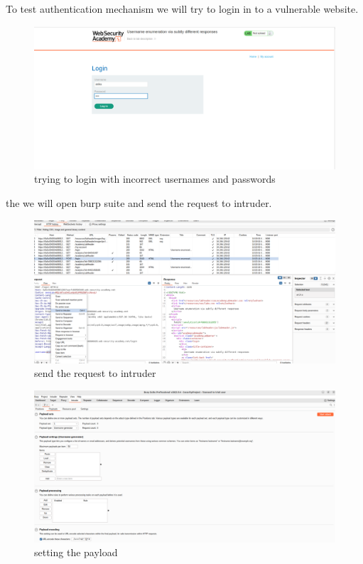 \documentclass[
	a4paper, %
	12pt, %
]{CSSullivanBusinessReport}
\begin{document}
To test authentication mechanism we will try to login in to a vulnerable website.

\begin{figure}[H]
    \centering
    \includegraphics[width=1\textwidth]{Images/anikaScreensots/enumeratinStart.png}
    \caption{trying to login with incorrect usernames and passwords}
    \label{fig:enter-label}
\end{figure}
	

the we will open burp suite and send the request to intruder.   

\begin{figure}[H]
    \centering
    \includegraphics[width=1\textwidth]{Images/anikaScreensots/EnuStep1.png}
    \caption{send the request to intruder}
    \label{fig:enter-label}
\end{figure}

\begin{figure}[H]
    \centering
    \includegraphics[width=1\textwidth]{Images/anikaScreensots/STEP2.png}
    \caption{setting the payload}
    \label{fig:enter-label}
\end{figure}
\end{document}
